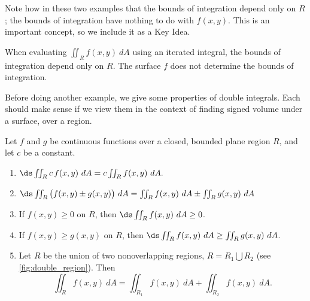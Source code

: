 Note how in these two examples that the bounds of integration depend only on $R$; the bounds of integration have nothing to do with $f(x,y)$. This is an important concept, so we include it  as a Key Idea.

\begin{keyidea}\label{idea:bounds_on_double}
When evaluating $\iint_Rf(x,y)\ dA$ using an iterated integral, the bounds of integration depend only on $R$. The surface $f$ does not determine the bounds of integration.
\end{keyidea}

Before doing another example, we give some properties of double integrals. Each should make sense if we view them in the context of finding signed volume under a surface, over a region.

\begin{theorem}\label{thm:double_prop}
Let $f$ and $g$ be continuous functions over a closed, bounded plane region $R$, and let $c$ be a constant.
\begin{enumerate}
	\item $\ds \iint_Rc\,f(x,y)\ dA = c\iint_Rf(x,y)\ dA.$
	\item	$\ds \iint_R \big(f(x,y)\pm g(x,y)\big)\ dA = \iint_R f(x,y)\ dA \pm \iint_R g(x,y)\ dA $
	\item	If $f(x,y)\geq 0$ on $R$, then $\ds \iint_R f(x,y)\ dA\geq 0$.
	\item	If $f(x,y)\geq g(x,y)$ on $R$, then $\ds \iint_R f(x,y)\ dA\geq \iint_R g(x,y)\ dA$.
	\item \label{thm:double_prop_regions}	Let $R$ be the union of two nonoverlapping regions, $R = R_1\bigcup R_2$ (see \autoref{fig:double_region}). Then 
	\[\iint_R f(x,y)\ dA = \iint_{R_1}f(x,y)\ dA+ \iint_{R_2}f(x,y)\ dA.\]
\end{enumerate}
\end{theorem}


